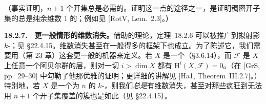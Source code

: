 （事实证明，$n+1$ 个\trAffine{}开集总是必需的。证明这一点的途径之一，是证明稠密\trAffine{}开子集的\trComplement{}总是纯余维数 $1$ 的；例如见 [RotV, Lem.~2.3]。）

\textbf{18.2.7.}\ \hard\ \textbf{更一般情形的维数\trCohomology{}消失。}\quad 借助\trBlowup{}的理论，\mbox{定理~18.2.6} 可以被推广到拟射影 $k$-\trScheme；见 \S22.4.15。维数\trCohomology{}消失甚至在一般得多的框架下也成立。为了陈述它，我们需要用\trDerivedFunctor{}（第 23 章）这套更一般的机器来定义\trCohomology。若 $X$ 是一个\trNoetherian\trTopologicalSpace（\S3.6.14），而 $\mathscr{F}$ 是 $X$ 上任意一个阿贝尔群的层，则对一切 $i>\dim X$ 都有 $\mathrm{H}^i(X,\mathscr{F})=0$。（\trGrothendieck{}在 [GrS, pp.~29--30] 中勾勒了他那优雅的证明；更详细的讲解见 [Ha1, Theorem~III.2.7]。）特别地，若 $X$ 是一个\trDimension{}为 $n$ 的 $k$-\trVariety，则我们\emph{总是}有维数\trCohomology{}消失，甚至对那些疯狂到无法用 $n+1$ 个\trAffine{}开子集覆盖的簇也是如此（见 \S22.4.15）。
